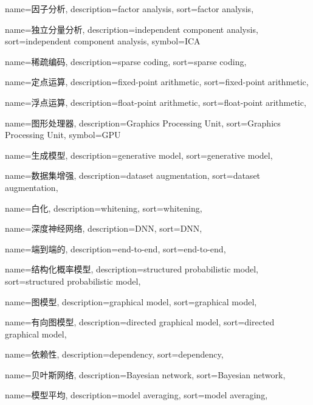 {
  name=因子分析,
  description={factor analysis},
  sort={factor analysis},
}

{
  name=独立分量分析,
  description={independent component analysis},
  sort={independent component analysis},
  symbol={ICA}
}

{
  name=稀疏编码,
  description={sparse coding},
  sort={sparse coding},
}

{
  name=定点运算,
  description={fixed-point arithmetic},
  sort={fixed-point arithmetic},
}

{
  name=浮点运算,
  description={float-point arithmetic},
  sort={float-point arithmetic},
}

{
  name=图形处理器,
  description={Graphics Processing Unit},
  sort={Graphics Processing Unit},
  symbol={GPU}
}

{
  name=生成模型,
  description={generative model},
  sort={generative model},
}

{
  name=数据集增强,
  description={dataset augmentation},
  sort={dataset augmentation},
}

{
  name=白化,
  description={whitening},
  sort={whitening},
}

{
  name=深度神经网络,
  description={DNN},
  sort={DNN},
}

{
  name=端到端的,
  description={end-to-end},
  sort={end-to-end},
}

{
  name=结构化概率模型,
  description={structured probabilistic model},
  sort={structured probabilistic model},
}

{
  name=图模型,
  description={graphical model},
  sort={graphical model},
}

{
  name=有向图模型,
  description={directed graphical model},
  sort={directed graphical model},
}

{
  name=依赖性,
  description={dependency},
  sort={dependency},
}

{
  name=贝叶斯网络,
  description={Bayesian network},
  sort={Bayesian network},
}

{
  name=模型平均,
  description={model averaging},
  sort={model averaging},
}

